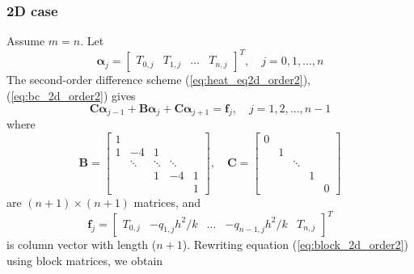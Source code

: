 \documentclass{article}
\begin{document}
\subsubsection{2D case}
Assume $m = n$. Let
\begin{equation*}
    \bm\alpha_j =
    \begin{bmatrix}
    T_{0,j} & T_{1,j} & \dots & T_{n,j}
    \end{bmatrix}^T ,
    \quad j = 0, 1, \dots, n
\end{equation*}
The second-order difference scheme (\ref{eq:heat_eq2d_order2}), (\ref{eq:bc_2d_order2}) gives
\begin{equation} \label{eq:block_2d_order2}
    \bm C \bm\alpha_{j-1} + \bm B \bm\alpha_j + \bm C \bm\alpha_{j+1} = \bm f_j,
    \quad j = 1, 2, \dots, n-1
\end{equation}
where
\begin{equation*}
    \bm B = 
    \begin{bmatrix}
    1 \\
    1 & -4 & 1 \\
      & \ddots & \ddots & \ddots \\
      &        & 1      &   -4   &  1 \\
      &        &        &        &  1
    \end{bmatrix},
    \quad
    \bm C =
    \begin{bmatrix}
    0 \\
      &  1  \\
      &     & \ddots \\
      &     &        &  1 \\
      &     &        &    & 0
    \end{bmatrix}
\end{equation*}
are $(n+1) \times (n+1)$ matrices, and
\begin{equation*}
    \bm f_j = 
    \begin{bmatrix}
    T_{0,j} & -q_{1,j} h^2 /k & \dots & -q_{n-1,j}h^2/k & T_{n,j}
    \end{bmatrix}^T
\end{equation*}
is column vector with length ($n+1$). Rewriting equation (\ref{eq:block_2d_order2}) using block matrices,
we obtain
\end{document}

